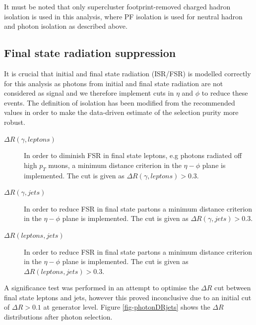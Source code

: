 It must be noted that only supercluster footprint-removed charged hadron isolation is used in this analysis, where PF isolation is used for neutral hadron and photon isolation as described above. 

\subsection{Final state radiation suppression}

It is crucial that initial and final state radiation (ISR/FSR) is modelled correctly for this analysis as photons from initial and final state radiation are not considered as signal and we therefore implement cuts in $\eta$ and $\phi$ to reduce these events. The definition of isolation has been modified from the recommended values in order to make the data-driven estimate of the selection purity more robust.

\begin{description}
\item[$\Delta R(\gamma, leptons)$] In order to diminish FSR in final state leptons, e.g photons radiated off high $p_T$ muons, a minimum distance criterion in the $\eta - \phi$ plane is implemented. The cut is given as $\Delta R(\gamma, leptons) > 0.3$.

\item[$\Delta R(\gamma, jets)$] In order to reduce FSR in final state partons a minimum distance criterion in the $\eta - \phi$ plane is implemented. The cut is given as $\Delta R(\gamma, jets) > 0.3$.

\item[$\Delta R(leptons, jets)$] In order to reduce FSR in final state partons a minimum distance criterion in the $\eta - \phi$ plane is implemented. The cut is given as $\Delta R(leptons, jets) > 0.3$.
\end{description}

A significance test was performed in an attempt to optimise the $\Delta R$ cut between final state leptons and jets, however this proved inconclusive due to an initial cut of $\Delta R > 0.1$ at generator level. Figure \ref{fig-photonDRjets} shows the $\Delta R$ distributions after photon selection.

